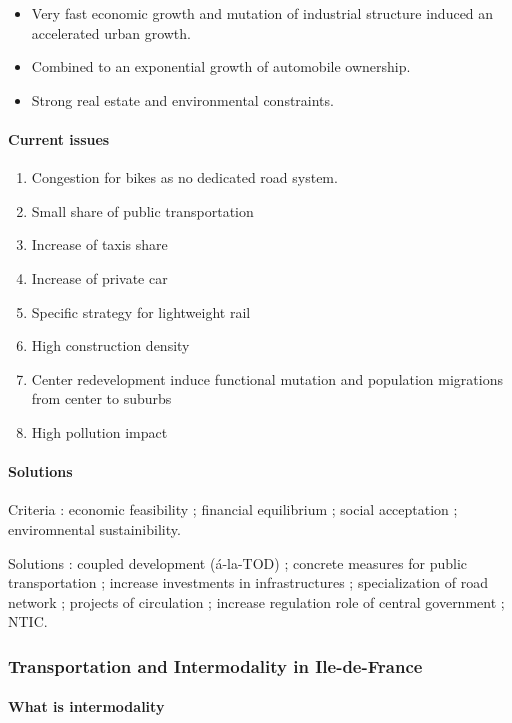 \begin{itemize}
\item Very fast economic growth and mutation of industrial structure induced an accelerated urban growth.
\item Combined to an exponential growth of automobile ownership.
\item Strong real estate and environmental constraints.
\end{itemize}

\paragraph{Current issues}

\begin{enumerate}
\item Congestion for bikes as no dedicated road system.
\item Small share of public transportation
\item Increase of taxis share
\item Increase of private car
\item Specific strategy for lightweight rail
\item High construction density
\item Center redevelopment induce functional mutation and population migrations from center to suburbs
\item High pollution impact
\end{enumerate}

\paragraph{Solutions}

Criteria : economic feasibility ; financial equilibrium ; social acceptation ; enviromnental sustainibility.

Solutions : coupled development ({\'a}-la-TOD) ; concrete measures for public transportation ; increase investments in infrastructures ; specialization of road network ; projects of circulation ; increase regulation role of central government ; NTIC.


\subsubsection{Transportation and Intermodality in Ile-de-France}

\paragraph{What is intermodality}

